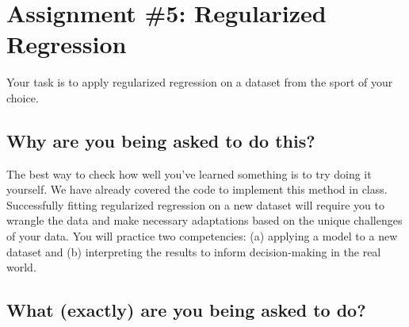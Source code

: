 \documentclass{article}
\begin{document}
  \section*{\sc Assignment \#5: Regularized Regression}

    Your task is to apply regularized regression on a dataset from the sport of your choice.
  
    \subsection*{\sc Why are you being asked to do this?}

      The best way to check how well you've learned something is to try doing it yourself. We have already covered the code to implement this method in class. Successfully fitting regularized regression on a new dataset will require you to wrangle the data and make necessary adaptations based on the unique challenges of your data. You will practice two competencies: (a) applying a model to a new dataset and (b) interpreting the results to inform decision-making in the real world.

    \subsection*{\sc What (exactly) are you being asked to do?}
\end{document}
